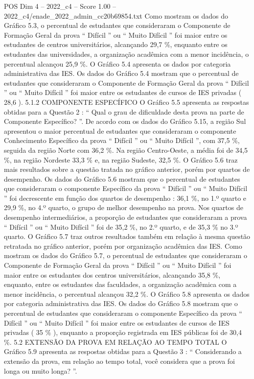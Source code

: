 \begin{textsample}{POS Dim 4 – 2022\_c4 – Score 1.00 – 2022\_c4/enade\_2022\_admin\_cc20b69854.txt}
Como mostram os dados do Gráfico 5.3, o percentual de estudantes que consideraram o Componente de Formação Geral da prova “ Difícil ” ou “ Muito Difícil ” foi maior entre os estudantes de centros universitários, alcançando 29,7 \%, enquanto entre os estudantes das universidades, a organização acadêmica com a menor incidência, o percentual alcançou 25,9 \%.
O Gráfico 5.4 apresenta os dados por categoria administrativa das IES.
Os dados do Gráfico 5.4 mostram que o percentual de estudantes que consideraram o Componente de Formação Geral da prova “ Difícil ” ou “ Muito Difícil ” foi maior entre os estudantes de cursos de IES privadas ( 28,6 ). 5.1.2 COMPONENTE ESPECÍFICO O Gráfico 5.5 apresenta as respostas obtidas para a Questão 2 : “ Qual o grau de dificuldade desta prova na parte de Componente Específico? ”.
De acordo com os dados do Gráfico 5.15, a região Sul apresentou o maior percentual de estudantes que consideraram o componente Conhecimento Específico da prova “ Difícil ” ou “ Muito Difícil ”, com 37,5 \%, seguida da região Norte com 36,2 \%.
Na região Centro-Oeste, a média foi de 34,5 \%, na região Nordeste 33,3 \% e, na região Sudeste, 32,5 \%.
O Gráfico 5.6 traz mais resultados sobre a questão tratada no gráfico anterior, porém por quartos de desempenho.
Os dados do Gráfico 5.6 mostram que o percentual de estudantes que consideraram o componente Específico da prova “ Difícil ” ou “ Muito Difícil ” foi decrescente em função dos quartos de desempenho : 36,1 \%, no 1.º quarto e 29,9 \%, no 4.º quarto, o grupo de melhor desempenho na prova.
Nos quartos de desempenho intermediários, a proporção de estudantes que consideraram a prova “ Difícil ” ou “ Muito Difícil ” foi de 35,2 \%, no 2.º quarto, e de 35,3 \% no 3.º quarto.
O Gráfico 5.7 traz outros resultados também em relação à mesma questão retratada no gráfico anterior, porém por organização acadêmica das IES.
Como mostram os dados do Gráfico 5.7, o percentual de estudantes que consideraram o Componente de Formação Geral da prova “ Difícil ” ou “ Muito Difícil ” foi maior entre os estudantes dos centros universitários, alcançando 35,8 \%, enquanto, entre os estudantes das faculdades, a organização acadêmica com a menor incidência, o percentual alcançou 32,2 \%.
O Gráfico 5.8 apresenta os dados por categoria administrativa das IES.
Os dados do Gráfico 5.8 mostram que o percentual de estudantes que consideraram o componente Específico da prova “ Difícil ” ou “ Muito Difícil ” foi maior entre os estudantes de cursos de IES privadas ( 35 \% ), enquanto a proporção registrada em IES públicas foi de 30,4 \%. 5.2 EXTENSÃO DA PROVA EM RELAÇÃO AO TEMPO TOTAL O Gráfico 5.9 apresenta as respostas obtidas para a Questão 3 : “ Considerando a extensão da prova, em relação ao tempo total, você considera que a prova foi longa ou muito longa? ”.

\end{textsample}
